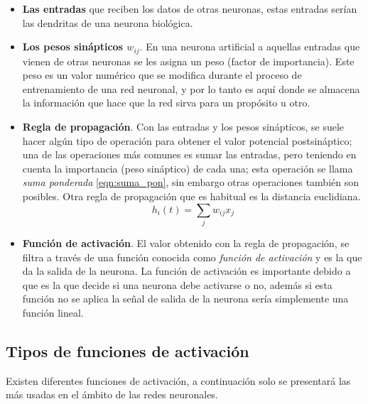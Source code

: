 \begin{itemize}
\item \textbf{Las entradas} que reciben los datos de otras neuronas, estas entradas ser\'{i}an las dendritas de una neurona biol\'{o}gica.
\item \textbf{Los pesos sin\'{a}pticos $w_{ij}$}. En una neurona artificial a aquellas entradas que vienen de otras neuronas se les asigna un peso (factor de importancia). Este peso es un valor num\'{e}rico que se modifica durante el proceso de entrenamiento de una red neuronal, y por lo tanto es aqu\'{i} donde se almacena la informaci\'{o}n que hace que la red sirva para un prop\'{o}sito u otro.
\item \textbf{Regla de propagaci\'{o}n}. Con las entradas y los pesos sin\'{a}pticos, se suele hacer alg\'{u}n tipo de operaci\'{o}n para obtener el valor potencial postsin\'{a}ptico; una de las operaciones m\'{a}s comunes es sumar las entradas, pero teniendo en cuenta la importancia (peso sin\'{a}ptico) de cada una; esta operaci\'{o}n se llama \textit{suma ponderada} \ref{eqn:suma_pon}, sin embargo otras operaciones tambi\'{e}n son posibles. Otra regla de propagaci\'{o}n que es habitual es la distancia euclidiana.
\begin{equation}
h_{i}(t) = \sum_{j}{w_{ij}x_{j}}
\label{eqn:suma_pon}
\end{equation}
\item \textbf{Funci\'{o}n de activaci\'{o}n}. El valor obtenido con la regla de propagaci\'{o}n, se filtra a trav\'{e}s de una funci\'{o}n conocida como \textit{funci\'{o}n de activaci\'{o}n} y es la que da la salida de la neurona. La función de activación es importante debido a que es la que decide si una neurona debe activarse o no, adem\'{a}s si esta función no se aplica la señal de salida de la neurona sería simplemente una función lineal.
\end{itemize}

\subsection{Tipos de funciones de activaci\'{o}n}

Existen diferentes funciones de activaci\'{o}n, a continuaci\'{o}n solo se presentar\'{a} las m\'{a}s usadas en el \'{a}mbito de las redes neuronales.

